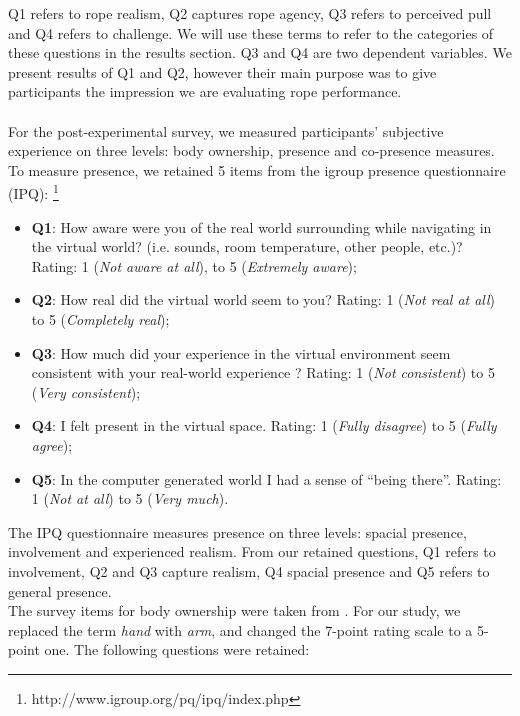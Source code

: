 Q1 refers to rope realism, Q2 captures rope agency, Q3 refers to perceived pull and Q4 refers to challenge. We will use these terms to refer to the categories of these questions in the results section. Q3 and Q4 are two dependent variables. We present results of Q1 and Q2, however their main purpose was to give participants the impression we are evaluating rope performance.\\
\\
For the post-experimental survey, we measured participants' subjective experience on three levels: body ownership, presence and co-presence measures. 
To measure presence, we retained 5 items from the igroup presence questionnaire (IPQ): \footnote{http://www.igroup.org/pq/ipq/index.php}
\begin{itemize}
\label{enum:presenceQuestions}
\itemsep0em
    \item \textbf{Q1}: How aware were you of the real world surrounding while navigating in the virtual world? (i.e. sounds, room temperature, other people, etc.)? Rating: 1 (\textit{Not aware at all}), to 5 (\textit{Extremely aware});
    \item \textbf{Q2}: How real did the virtual world seem to you? Rating: 1 (\textit{Not real at all}) to 5 (\textit{Completely real});
    \item \textbf{Q3}: How much did your experience in the virtual environment seem consistent with your real-world experience ?  Rating: 1 (\textit{Not consistent}) to 5 (\textit{Very consistent});
    \item \textbf{Q4}: I felt present in the virtual space. Rating: 1 (\textit{Fully disagree}) to 5 (\textit{Fully agree});
    \item \textbf{Q5}: In the computer generated world I had a sense of ``being there''.  Rating: 1 (\textit{Not at all}) to 5 (\textit{Very much}). 
\end{itemize}
The IPQ questionnaire measures presence on three levels: spacial presence, involvement and experienced realism. From our retained questions, Q1 refers to involvement, Q2 and Q3 capture realism, Q4 spacial presence and Q5 refers to general presence.
\\
The survey items for body ownership were taken from \cite{argelaguet2016role}. For our study, we replaced the term \textit{hand} with \textit{arm}, and changed the 7-point rating scale to a 5-point one. The following questions were retained:
